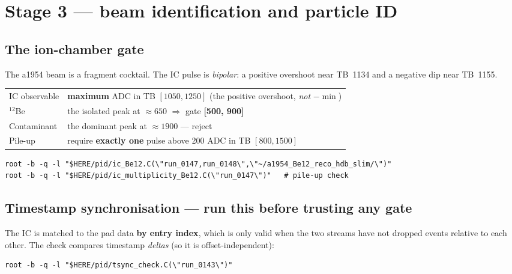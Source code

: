 \documentclass[11pt,a4paper]{article}
\begin{document}
\section{Stage 3 --- beam identification and particle ID}
\label{sec:pid}

\subsection{The ion-chamber gate}

The a1954 beam is a fragment cocktail. The IC pulse is \emph{bipolar}: a positive
overshoot near TB~1134 and a negative dip near TB~1155.

\begin{center}
\begin{tabular}{@{}ll@{}}
\toprule
IC observable & \textbf{maximum} ADC in TB $[1050,1250]$ (the positive overshoot, \emph{not} $-\min$) \\
$^{12}$Be     & the isolated peak at $\approx 650$ $\Rightarrow$ gate \textbf{[500, 900]} \\
Contaminant   & the dominant peak at $\approx 1900$ --- reject \\
Pile-up       & require \textbf{exactly one} pulse above 200 ADC in TB $[800,1500]$ \\
\bottomrule
\end{tabular}
\end{center}

\begin{lstlisting}
root -b -q -l "$HERE/pid/ic_Be12.C(\"run_0147,run_0148\",\"~/a1954_Be12_reco_hdb_slim/\")"
root -b -q -l "$HERE/pid/ic_multiplicity_Be12.C(\"run_0147\")"   # pile-up check
\end{lstlisting}

\subsection{Timestamp synchronisation --- run this before trusting any gate}
\label{sec:tsync}

The IC is matched to the pad data \textbf{by entry index}, which is only valid when the two
streams have not dropped events relative to each other. The check compares timestamp
\emph{deltas} (so it is offset-independent):

\begin{lstlisting}
root -b -q -l "$HERE/pid/tsync_check.C(\"run_0143\")"
\end{lstlisting}
\end{document}
